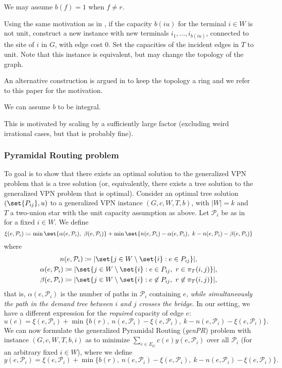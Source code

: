 \begin{fact}
    We may assume $b(f) = 1$ when $f \neq r$.
\end{fact}
Using the same motivation as in \cite{grandoni2008short}, if the capacity $b(iu)$ for the terminal $i \in W$ is not unit, construct a new instance with new terminals $i_1, \dots, i_{b(iu)}$, connected to the site of $i$ in $G$, with edge cost $0$.
Set the capacities of the incident edges in $T$ to unit.
Note that this instance is equivalent, but may change the topology of the graph.

An alternative construction is argued in \cite{grandoni2008short} to keep the topology a ring and we refer to this paper for the motivation.

\begin{fact}
    We can assume $b$ to be integral.
\end{fact}
This is motivated by scaling by a sufficiently large factor (excluding weird irrational cases, but that is probably fine).

\subsubsection{Pyramidal Routing problem}
To goal is to show that there exists an optimal solution to the generalized VPN problem that is a tree solution (or, equivalently, there exists a tree solution to the generalized VPN problem that is optimal).
Consider an optimal tree solution $(\set{P_{ij}}, u)$ to a generalized VPN instance $(G, c, W, T, b)$, with $|W| = k$ and $T$ a two-union star with the unit capacity assumption as above.
Let $\mathcal P_i$ be as in \cite{grandoni2008short} for a fixed $i \in W$.
We define
\[
    \xi(e, \mathcal P_i) \coloneqq \min\set{\alpha(e, \mathcal P_i),\ \beta(e, \mathcal P_i)} + \min\set{n(e, \mathcal P_i) - \alpha(e, \mathcal P_i),\ k - n(e, \mathcal P_i) - \beta(e, \mathcal P_i)}
\]
where
\begin{gather*}
    n(e, \mathcal P_i) \coloneqq |\set{j \in W \setminus \set{i} : e \in P_{ij}}|,\\
    \alpha(e, \mathcal P_i) \coloneqq |\set{j \in W \setminus \set{i} : e \in P_{ij},\ r \in \pi_T(i, j)}|,\\
    \beta(e, \mathcal P_i) \coloneqq |\set{j \in W \setminus \set{i} : e \not\in P_{ij},\ r \not\in \pi_T(i, j)}|,
\end{gather*}
that is, $\alpha(e, \mathcal P_i)$ is the number of paths in $\mathcal P_i$ containing $e$, \emph{while simultaneously the path in the demand tree between $i$ and $j$ crosses the bridge}.
In our setting, we have a different expression for the \emph{required} capacity of edge $e$:
\[
    u(e) = \xi(e, \mathcal P_i) + \min\Big\{b(r),\ n(e, \mathcal P_i) - \xi(e, \mathcal P_i),\ k - n(e, \mathcal P_i) -  \xi(e, \mathcal P_i)\Big\}.
\]
We can now formulate the generalized Pyramidal Routing (\emph{genPR}) problem with instance $(G, c, W, T, b, i)$ as to minimize $\sum_{e \in E_G} c(e) y(e, \mathcal P_i)$ over all $\mathcal P_i$ (for an arbitrary fixed $i \in W$), where we define
\[
    y(e, \mathcal P_i) = \xi(e, \mathcal P_i) + \min\Big\{b(r),\ n(e, \mathcal P_i) - \xi(e, \mathcal P_i),\ k - n(e, \mathcal P_i) -  \xi(e, \mathcal P_i)\Big\}.
\]

